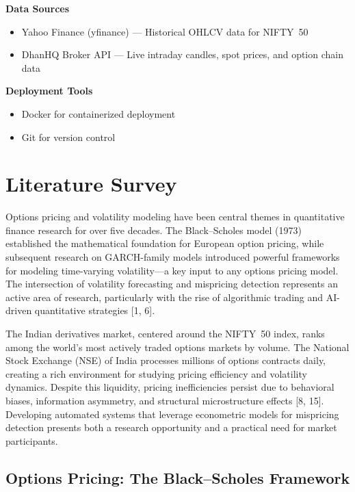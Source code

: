 \documentclass[12pt,a4paper]{article}
\begin{document}
\textbf{Data Sources}

\begin{itemize}
    \item Yahoo Finance (yfinance) --- Historical OHLCV data for NIFTY~50
    \item DhanHQ Broker API --- Live intraday candles, spot prices, and option chain data
\end{itemize}

\textbf{Deployment Tools}

\begin{itemize}
    \item Docker for containerized deployment
    \item Git for version control
\end{itemize}

\newpage
\section{Literature Survey}

Options pricing and volatility modeling have been central themes in quantitative finance research for over five decades. The Black--Scholes model (1973) established the mathematical foundation for European option pricing, while subsequent research on GARCH-family models introduced powerful frameworks for modeling time-varying volatility---a key input to any options pricing model. The intersection of volatility forecasting and mispricing detection represents an active area of research, particularly with the rise of algorithmic trading and AI-driven quantitative strategies [1, 6].

The Indian derivatives market, centered around the NIFTY~50 index, ranks among the world's most actively traded options markets by volume. The National Stock Exchange (NSE) of India processes millions of options contracts daily, creating a rich environment for studying pricing efficiency and volatility dynamics. Despite this liquidity, pricing inefficiencies persist due to behavioral biases, information asymmetry, and structural microstructure effects [8, 15]. Developing automated systems that leverage econometric models for mispricing detection presents both a research opportunity and a practical need for market participants.

\subsection{Options Pricing: The Black--Scholes Framework}
\end{document}
